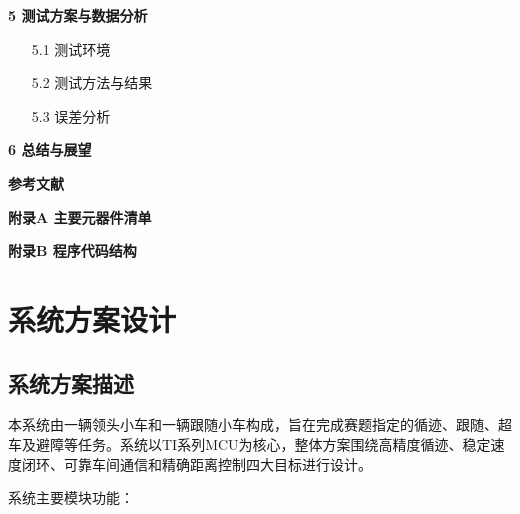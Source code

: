 \documentclass[UTF8]{ctexart}
\begin{document}
\noindent
\textbf{5 测试方案与数据分析} 
\begin{itemize}
    \item[5.1] 测试环境 
    \item[5.2] 测试方法与结果 
    \item[5.3] 误差分析 
\end{itemize}

\noindent
\textbf{6 总结与展望} 

\noindent
\textbf{参考文献} 

\noindent
\textbf{附录A 主要元器件清单} 

\noindent
\textbf{附录B 程序代码结构} 

\newpage

\section{系统方案设计}

\subsection{系统方案描述}
  
本系统由一辆领头小车和一辆跟随小车构成，旨在完成赛题指定的循迹、跟随、超车及避障等任务。系统以TI系列MCU为核心，整体方案围绕高精度循迹、稳定速度闭环、可靠车间通信和精确距离控制四大目标进行设计。

系统主要模块功能：
\end{document}
